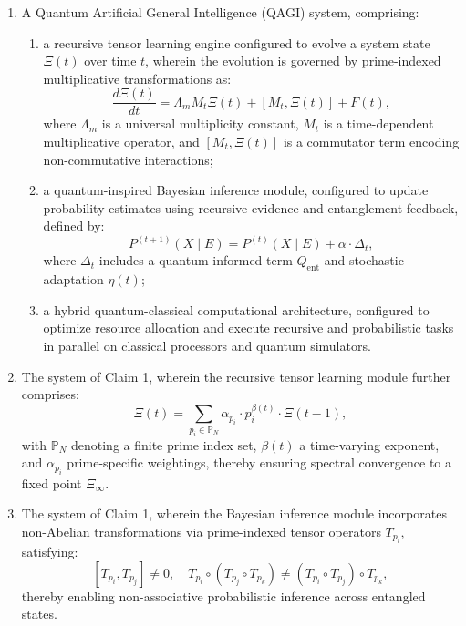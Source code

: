 \documentclass{article}
\theoremstyle{plain}
\theoremstyle{claimstyle}
\begin{document}
\begin{enumerate}

\item A Quantum Artificial General Intelligence (QAGI) system, comprising:
    \begin{enumerate}
        \item a recursive tensor learning engine configured to evolve a system state $\Xi(t)$ over time $t$, wherein the evolution is governed by prime-indexed multiplicative transformations as:
        \[
        \frac{d\Xi(t)}{dt} = \Lambda_m M_t \Xi(t) + [M_t, \Xi(t)] + F(t),
        \]
        where $\Lambda_m$ is a universal multiplicity constant, $M_t$ is a time-dependent multiplicative operator, and $[M_t, \Xi(t)]$ is a commutator term encoding non-commutative interactions;

        \item a quantum-inspired Bayesian inference module, configured to update probability estimates using recursive evidence and entanglement feedback, defined by:
        \[
        P^{(t+1)}(X \mid E) = P^{(t)}(X \mid E) + \alpha \cdot \Delta_t,
        \]
        where $\Delta_t$ includes a quantum-informed term $Q_{\text{ent}}$ and stochastic adaptation $\eta(t)$;

        \item a hybrid quantum-classical computational architecture, configured to optimize resource allocation and execute recursive and probabilistic tasks in parallel on classical processors and quantum simulators.
    \end{enumerate}

\item The system of Claim 1, wherein the recursive tensor learning module further comprises:
    \[
    \Xi(t) = \sum_{p_i \in \mathbb{P}_N} \alpha_{p_i} \cdot p_i^{\beta(t)} \cdot \Xi(t-1),
    \]
    with $\mathbb{P}_N$ denoting a finite prime index set, $\beta(t)$ a time-varying exponent, and $\alpha_{p_i}$ prime-specific weightings, thereby ensuring spectral convergence to a fixed point $\Xi_\infty$.

\item The system of Claim 1, wherein the Bayesian inference module incorporates non-Abelian transformations via prime-indexed tensor operators $T_{p_i}$, satisfying:
    \[
    [T_{p_i}, T_{p_j}] \neq 0, \quad T_{p_i} \circ (T_{p_j} \circ T_{p_k}) \neq (T_{p_i} \circ T_{p_j}) \circ T_{p_k},
    \]
    thereby enabling non-associative probabilistic inference across entangled states.


\end{enumerate}
\end{document}
